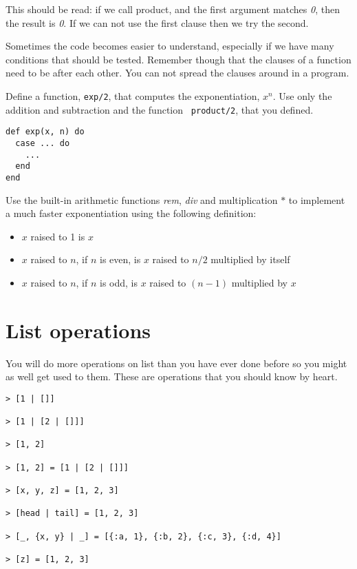 \documentclass[a4paper,11pt]{article}
\begin{document}
This should be read: if we call product, and the first argument
matches {\em 0}, then the result is {\em 0}. If we can not use the
first clause then we try the second.

Sometimes the code becomes easier to understand, especially if we have
many conditions that should be tested. Remember though that the
clauses of a function need to be after each other. You can not spread
the clauses around in a program.


Define a function, {\tt exp/2}, that computes the exponentiation,
$x^n$. Use only the addition and subtraction and the function {\tt
  product/2}, that you defined.
  
\begin{verbatim}
def exp(x, n) do
  case ... do
    ...
  end
end
\end{verbatim}

Use the built-in arithmetic functions {\em rem}, {\em div} and
multiplication {\em $*$} to implement a much faster exponentiation using
the following definition:

\begin{itemize}
  \item $x$ raised to 1 is $x$
  \item $x$ raised to $n$, if $n$ is even, is $x$ raised to $n/2$ multiplied by itself
  \item $x$ raised to $n$, if $n$ is odd, is $x$ raised to $(n-1)$ multiplied by $x$
\end{itemize}



\section{List operations}

You will do more operations on list than you have ever done before so
you might as well get used to them. These are operations that you should
know by heart.

\begin{verbatim}
> [1 | []]

> [1 | [2 | []]]

> [1, 2]

> [1, 2] = [1 | [2 | []]]

> [x, y, z] = [1, 2, 3]

> [head | tail] = [1, 2, 3]

> [_, {x, y} | _] = [{:a, 1}, {:b, 2}, {:c, 3}, {:d, 4}]

> [z] = [1, 2, 3]
\end{verbatim}
\end{document}
